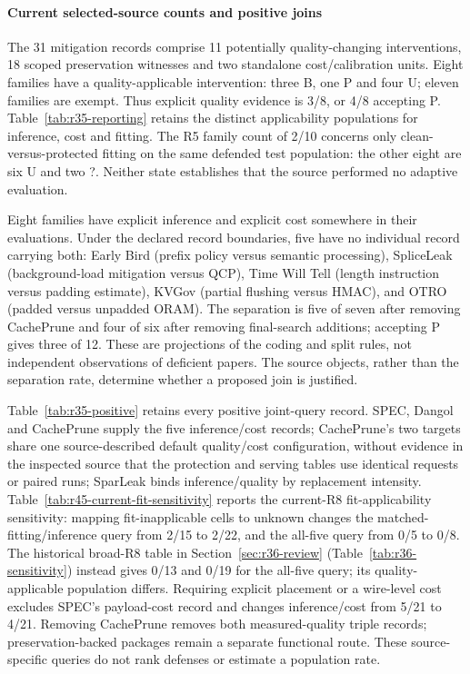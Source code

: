 \paragraph{Current selected-source counts and positive joins}
The 31 mitigation records comprise 11 potentially quality-changing interventions, 18 scoped preservation witnesses and two standalone cost/calibration units. Eight families have a quality-applicable intervention: three B, one P and four U; eleven families are exempt. Thus explicit quality evidence is 3/8, or 4/8 accepting P. Table~\ref{tab:r35-reporting} retains the distinct applicability populations for inference, cost and fitting. The R5 family count of 2/10 concerns only clean-versus-protected fitting on the same defended test population: the other eight are six U and two ?. Neither state establishes that the source performed no adaptive evaluation.


Eight families have explicit inference and explicit cost somewhere in their evaluations. Under the declared record boundaries, five have no individual record carrying both: Early Bird (prefix policy versus semantic processing), SpliceLeak (background-load mitigation versus QCP), Time Will Tell (length instruction versus padding estimate), KVGov (partial flushing versus HMAC), and OTRO (padded versus unpadded ORAM). The separation is five of seven after removing CachePrune and four of six after removing final-search additions; accepting P gives three of 12. These are projections of the coding and split rules, not independent observations of deficient papers. The source objects, rather than the separation rate, determine whether a proposed join is justified.

Table~\ref{tab:r35-positive} retains every positive joint-query record. SPEC, Dangol and CachePrune supply the five inference/cost records; CachePrune's two targets share one source-described default quality/cost configuration, without evidence in the inspected source that the protection and serving tables use identical requests or paired runs; SparLeak binds inference/quality by replacement intensity. Table~\ref{tab:r45-current-fit-sensitivity} reports the current-R8 fit-applicability sensitivity: mapping fit-inapplicable cells to unknown changes the matched-fitting/inference query from 2/15 to 2/22, and the all-five query from 0/5 to 0/8. The historical broad-R8 table in Section~\ref{sec:r36-review} (Table~\ref{tab:r36-sensitivity}) instead gives 0/13 and 0/19 for the all-five query; its quality-applicable population differs. Requiring explicit placement or a wire-level cost excludes SPEC's payload-cost record and changes inference/cost from 5/21 to 4/21. Removing CachePrune removes both measured-quality triple records; preservation-backed packages remain a separate functional route. These source-specific queries do not rank defenses or estimate a population rate.



